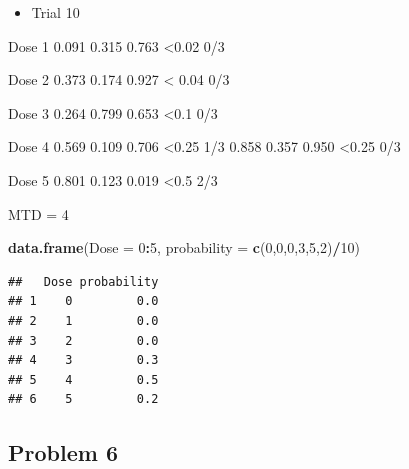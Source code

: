 \documentclass[]{article}
\newenvironment{Shaded}{\begin{snugshade}}{\end{snugshade}}
\newcommand{\DataTypeTok}[1]{\textcolor[rgb]{0.13,0.29,0.53}{#1}}
\newcommand{\DecValTok}[1]{\textcolor[rgb]{0.00,0.00,0.81}{#1}}
\newcommand{\FloatTok}[1]{\textcolor[rgb]{0.00,0.00,0.81}{#1}}
\newcommand{\KeywordTok}[1]{\textcolor[rgb]{0.13,0.29,0.53}{\textbf{#1}}}
\newcommand{\NormalTok}[1]{#1}
\newcommand{\OperatorTok}[1]{\textcolor[rgb]{0.81,0.36,0.00}{\textbf{#1}}}
\newcommand{\StringTok}[1]{\textcolor[rgb]{0.31,0.60,0.02}{#1}}
\providecommand{\tightlist}{%
  \setlength{\itemsep}{0pt}\setlength{\parskip}{0pt}}
\begin{document}
\begin{itemize}
\tightlist
\item
  Trial 10
\end{itemize}

Dose 1 0.091 0.315 0.763 \textless0.02 0/3

Dose 2 0.373 0.174 0.927 \textless{} 0.04 0/3

Dose 3 0.264 0.799 0.653 \textless0.1 0/3

Dose 4 0.569 0.109 0.706 \textless0.25 1/3 \textbar{} 0.858 0.357 0.950
\textless0.25 0/3

Dose 5 0.801 0.123 0.019 \textless0.5 2/3

MTD = 4

\begin{Shaded}
\begin{Highlighting}[]
\KeywordTok{data.frame}\NormalTok{(}\DataTypeTok{Dose =} \DecValTok{0}\OperatorTok{:}\DecValTok{5}\NormalTok{, }\DataTypeTok{probability =} \KeywordTok{c}\NormalTok{(}\DecValTok{0}\NormalTok{,}\DecValTok{0}\NormalTok{,}\DecValTok{0}\NormalTok{,}\DecValTok{3}\NormalTok{,}\DecValTok{5}\NormalTok{,}\DecValTok{2}\NormalTok{)}\OperatorTok{/}\DecValTok{10}\NormalTok{)}
\end{Highlighting}
\end{Shaded}

\begin{verbatim}
##   Dose probability
## 1    0         0.0
## 2    1         0.0
## 3    2         0.0
## 4    3         0.3
## 5    4         0.5
## 6    5         0.2
\end{verbatim}

\hypertarget{problem-6}{%
\subsection{Problem 6}\label{problem-6}}

\begin{Shaded}
\end{Shaded}
\end{document}
